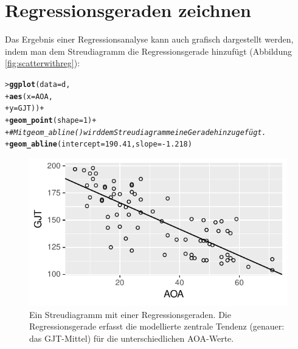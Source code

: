 \documentclass[oneside, 10pt]{book}\usepackage[]{graphicx}\usepackage[]{xcolor}
\makeatletter
\newcommand{\hlnum}[1]{\textcolor[rgb]{0.686,0.059,0.569}{#1}}%
\newcommand{\hlcom}[1]{\textcolor[rgb]{0.678,0.584,0.686}{\textit{#1}}}%
\newcommand{\hlopt}[1]{\textcolor[rgb]{0,0,0}{#1}}%
\newcommand{\hlstd}[1]{\textcolor[rgb]{0.345,0.345,0.345}{#1}}%
\newcommand{\hlkwc}[1]{\textcolor[rgb]{0.333,0.667,0.333}{#1}}%
\newcommand{\hlkwd}[1]{\textcolor[rgb]{0.737,0.353,0.396}{\textbf{#1}}}%
\newenvironment{kframe}{%
 \def\at@end@of@kframe{}%
 \ifinner\ifhmode%
  \def\at@end@of@kframe{\end{minipage}}%
  \begin{minipage}{\columnwidth}%
 \fi\fi%
 \def\FrameCommand##1{\hskip\@totalleftmargin \hskip-\fboxsep
 \colorbox{shadecolor}{##1}\hskip-\fboxsep
     \hskip-\linewidth \hskip-\@totalleftmargin \hskip\columnwidth}%
 \MakeFramed {\advance\hsize-\width
   \@totalleftmargin\z@ \linewidth\hsize
   \@setminipage}}%
 {\par\unskip\endMakeFramed%
 \at@end@of@kframe}
\newenvironment{knitrout}{}{} %
\makeatother
\begin{document}
\section{Regressionsgeraden zeichnen}
Das Ergebnis einer Regressionsanalyse kann auch grafisch dargestellt
werden, indem man dem Streudiagramm die Regressionsgerade hinzufügt
(Abbildung \ref{fig:scatterwithreg}):
\begin{knitrout}
\color{fgcolor}\begin{kframe}
\begin{alltt}
\hlstd{> }\hlkwd{ggplot}\hlstd{(}\hlkwc{data} \hlstd{= d,}
\hlstd{+ }       \hlkwd{aes}\hlstd{(}\hlkwc{x} \hlstd{= AOA,}
\hlstd{+ }           \hlkwc{y} \hlstd{= GJT))} \hlopt{+}
\hlstd{+ }  \hlkwd{geom_point}\hlstd{(}\hlkwc{shape} \hlstd{=} \hlnum{1}\hlstd{)} \hlopt{+}
\hlstd{+ }  \hlcom{# Mit geom_abline() wird dem Streudiagramm eine Gerade hinzugefügt.}
\hlstd{+ }  \hlkwd{geom_abline}\hlstd{(}\hlkwc{intercept} \hlstd{=} \hlnum{190.41}\hlstd{,} \hlkwc{slope} \hlstd{=} \hlopt{-}\hlnum{1.218}\hlstd{)}
\end{alltt}
\end{kframe}\begin{figure}[tp]

{\centering \includegraphics[width=.6\textwidth]{figs/unnamed-chunk-202-1} 

}

\caption{Ein Streudiagramm mit einer Regressionsgeraden. Die Regressionsgerade erfasst die modellierte zentrale Tendenz (genauer: das GJT-Mittel) für die unterschiedlichen AOA-Werte.\label{fig:scatterwithreg}}\label{fig:unnamed-chunk-202}
\end{figure}

\end{knitrout}
\end{document}
